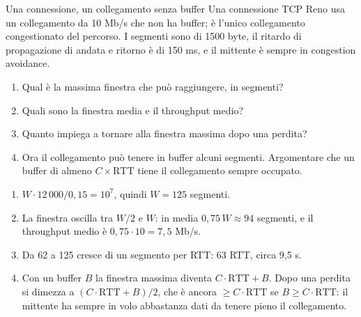 \begin{esercizio}{Una connessione, un collegamento senza buffer}
Una connessione TCP Reno usa un collegamento da 10 Mb/s che non ha buffer; è l'unico collegamento congestionato del percorso. I segmenti
sono di 1500 byte, il ritardo di propagazione di andata e ritorno è di 150 ms, e il mittente è sempre in congestion avoidance.
\begin{enumerate}[label=(\alph*)]
    \item Qual è la massima finestra che può raggiungere, in segmenti?
    \item Quali sono la finestra media e il throughput medio?
    \item Quanto impiega a tornare alla finestra massima dopo una perdita?
    \item Ora il collegamento può tenere in buffer alcuni segmenti. Argomentare che un buffer di almeno $C \times \text{RTT}$ tiene il
          collegamento sempre occupato.
\end{enumerate}

\svolgimento
\begin{enumerate}[label=(\alph*)]
    \item $W \cdot 12\,000 / 0{,}15 = 10^7$, quindi $W = 125$ segmenti.
    \item La finestra oscilla tra $W/2$ e $W$: in media $0{,}75\,W \approx 94$ segmenti, e il throughput medio è $0{,}75 \cdot 10 = 7{,}5$
          Mb/s.
    \item Da 62 a 125 cresce di un segmento per RTT: 63 RTT, circa 9,5 s.
    \item Con un buffer $B$ la finestra massima diventa $C \cdot \text{RTT} + B$. Dopo una perdita si dimezza a $(C \cdot \text{RTT} + B)/2$,
          che è ancora $\geq C \cdot \text{RTT}$ se $B \geq C \cdot \text{RTT}$: il mittente ha sempre in volo abbastanza dati da tenere
          pieno il collegamento.
\end{enumerate}
\end{esercizio}

